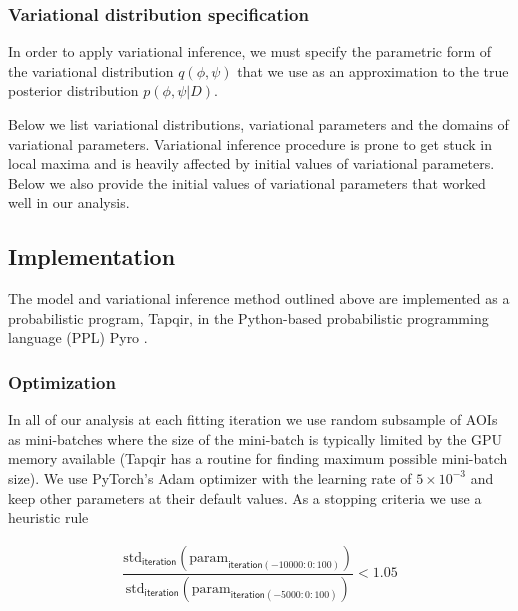 \subsubsection*{Variational distribution specification}

In order to apply variational inference, we must specify the parametric form of the variational distribution $q(\phi, \psi)$
that we use as an approximation to the true posterior distribution $p(\phi, \psi | D)$.

Below we list variational distributions, variational parameters and the domains of variational parameters. Variational inference procedure is prone to get stuck in local maxima and is heavily affected by initial values of variational parameters. Below we also provide the initial values of variational parameters that worked well in our analysis.





\subsection*{Implementation}

The model and variational inference method outlined above are implemented as a probabilistic program, Tapqir, in the Python-based probabilistic programming language (PPL) Pyro \cite{Foerster2018-kd,Bingham2019-qy,Obermeyer2019-xt}.

\subsubsection*{Optimization}

In all of our analysis at each fitting iteration we use random subsample of AOIs as mini-batches where the size of the mini-batch is typically limited by the GPU memory available (Tapqir has a routine for finding maximum possible mini-batch size). We use PyTorch's Adam optimizer with the learning rate of $5\times 10^{-3}$ and keep other parameters at their default values. As a stopping criteria we use a heuristic rule

\begin{subequations}
\begin{align}
    \dfrac{\mathrm{std}_\mathsf{iteration}(\mathrm{param}_{\mathsf{iteration}(-10000:0:100)})}{\mathrm{std}_\mathsf{iteration}(\mathrm{param}_{\mathsf{iteration}(-5000:0:100)})} < 1.05
\end{align}
\end{subequations}

